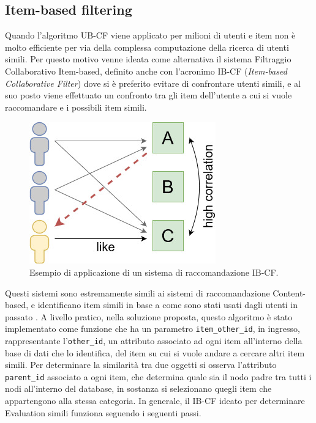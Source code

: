 \subsection{Item-based filtering}
Quando l'algoritmo UB-CF viene applicato per milioni di utenti e item non è molto efficiente per via della complessa computazione della 
ricerca di utenti simili. Per questo motivo venne ideata come alternativa il sistema Filtraggio Collaborativo Item-based, 
definito anche con l'acronimo IB-CF (\textit{Item-based Collaborative Filter}) dove si è preferito evitare di confrontare utenti 
simili, e al suo posto viene effettuato un confronto tra gli item dell'utente a cui si vuole raccomandare e i possibili item simili.
%
\begin{figure}[ht!]
    \centering
    \includegraphics[scale=0.7]{images/IB_CF_ex.jpg}
    \caption[Applicazione di un sistema di raccomandazione IB-CF]{Esempio di applicazione di un sistema di raccomandazione IB-CF.}
    \label{fig:IB_CF}
\end{figure}
\hfill\break
Questi sistemi sono estremamente simili ai sistemi di raccomandazione Content-based, e identificano item simili in base a come sono 
stati usati dagli utenti in passato \cite{item-based-collaborative-filtering}.\hfill\break
A livello pratico, nella soluzione proposta, questo algoritmo è stato implementato come funzione che ha un 
parametro \texttt{item\_other\_id}, in ingresso, rappresentante l'\texttt{other\_id}, un attributo associato ad ogni item all'interno della base di dati 
che lo identifica, del item su cui si vuole andare a cercare altri item simili. Per determinare la similarità tra due oggetti si osserva 
l'attributo \texttt{parent\_id} associato a ogni item, che determina quale sia il nodo padre tra tutti i nodi all'interno del database, in sostanza 
si selezionano quegli item che appartengono alla stessa categoria.\hfill\break
In generale, il IB-CF ideato per determinare Evaluation simili funziona seguendo i seguenti passi.
